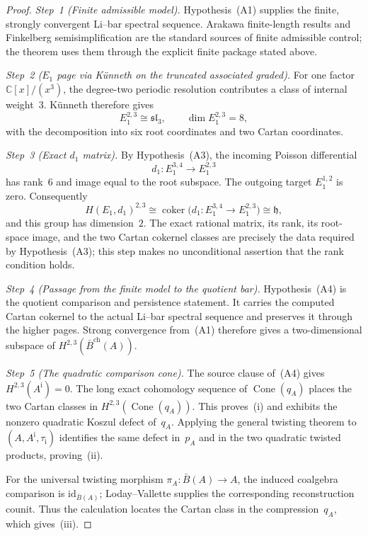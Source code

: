 \begin{proof}
\emph{Step~1 (Finite admissible model).}
Hypothesis~\textup{(A1)} supplies the finite, strongly convergent
Li--bar spectral sequence. Arakawa finite-length results and
Finkelberg semisimplification are the standard sources of finite
admissible control; the theorem uses them through the explicit finite
package stated above.

\emph{Step~2 \textup{(}$E_1$ page via K\"unneth on the truncated
associated graded\textup{)}.}
For one factor $\mathbb C[x]/(x^3)$, the degree-two periodic
resolution contributes a class of internal weight~$3$.
K\"unneth therefore gives
\[
 E_1^{2,3}\cong\mathfrak{sl}_3,
 \qquad \dim E_1^{2,3}=8,
\]
with the decomposition into six root coordinates and two Cartan
coordinates.

\emph{Step~3 (Exact $d_1$ matrix).}
By Hypothesis~\textup{(A3)}, the incoming Poisson differential
\[
 d_1\colon E_1^{3,4}\longrightarrow E_1^{2,3}
\]
has rank~$6$ and image equal to the root subspace.  The outgoing
target $E_1^{1,2}$ is zero.  Consequently
\[
 H(E_1,d_1)^{2,3}
 \cong \operatorname{coker}
 \bigl(d_1\colon E_1^{3,4}\to E_1^{2,3}\bigr)
 \cong \mathfrak h,
\]
and this group has dimension~$2$.  The exact rational matrix, its
rank, its root-space image, and the two Cartan cokernel classes are
precisely the data required by Hypothesis~\textup{(A3)}; this step
makes no unconditional assertion that the rank condition holds.

\emph{Step~4 (Passage from the finite model to the quotient bar).}
Hypothesis~\textup{(A4)} is the quotient comparison and persistence
statement.  It carries the computed Cartan cokernel to the actual
Li--bar spectral sequence and preserves it through the higher pages.
Strong convergence from~\textup{(A1)} therefore gives a
two-dimensional subspace of
$H^{2,3}(\bar B^{\mathrm{ch}}(A))$.

\emph{Step~5 (The quadratic comparison cone).}
The source clause of~\textup{(A4)} gives
$H^{2,3}(A^{\mathrm i})=0$.  The long exact cohomology sequence of
$\operatorname{Cone}(q_A)$ places the two Cartan classes in
$H^{2,3}(\operatorname{Cone}(q_A))$.  This proves~(i) and exhibits
the nonzero quadratic Koszul defect of~$q_A$.  Applying the general
twisting theorem to $(A,A^{\mathrm i},\tau_{\mathrm i})$ identifies the same
defect in~$p_A$ and in the two quadratic twisted products,
proving~(ii).

For the universal twisting morphism
$\pi_A\colon\bar B(A)\to A$, the induced coalgebra comparison is
$\mathrm{id}_{\bar B(A)}$; Loday--Vallette
\cite[Corollary~2.3.4]{LV12} supplies the corresponding
reconstruction counit.  Thus the calculation locates the Cartan
class in the compression~$q_A$, which gives~(iii).
\end{proof}

